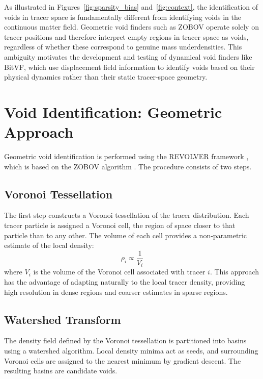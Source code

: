 \documentclass[12pt]{report}
\begin{document}
As illustrated in Figures~\ref{fig:sparsity_bias} and~\ref{fig:context}, the identification of voids in tracer space is fundamentally different from identifying voids in the continuous matter field. Geometric void finders such as ZOBOV operate solely on tracer positions and therefore interpret empty regions in tracer space as voids, regardless of whether these correspond to genuine mass underdensities. This ambiguity motivates the development and testing of dynamical void finders like BitVF, which use displacement field information to identify voids based on their physical dynamics rather than their static tracer-space geometry.


\section{Void Identification: Geometric Approach}
\label{sec:geometric_id}

Geometric void identification is performed using the REVOLVER framework \citep{Nadathur2019}, which is based on the ZOBOV algorithm \citep{Neyrinck2008}. The procedure consists of two steps.

\subsection{Voronoi Tessellation}

The first step constructs a Voronoi tessellation of the tracer distribution. Each tracer particle is assigned a Voronoi cell, the region of space closer to that particle than to any other. The volume of each cell provides a non-parametric estimate of the local density:
\begin{equation}
    \rho_i \propto \frac{1}{V_i}
    \label{eq:voronoi_density}
\end{equation}
where $V_i$ is the volume of the Voronoi cell associated with tracer $i$. This approach has the advantage of adapting naturally to the local tracer density, providing high resolution in dense regions and coarser estimates in sparse regions.

\subsection{Watershed Transform}

The density field defined by the Voronoi tessellation is partitioned into basins using a watershed algorithm. Local density minima act as seeds, and surrounding Voronoi cells are assigned to the nearest minimum by gradient descent. The resulting basins are candidate voids.
\end{document}
